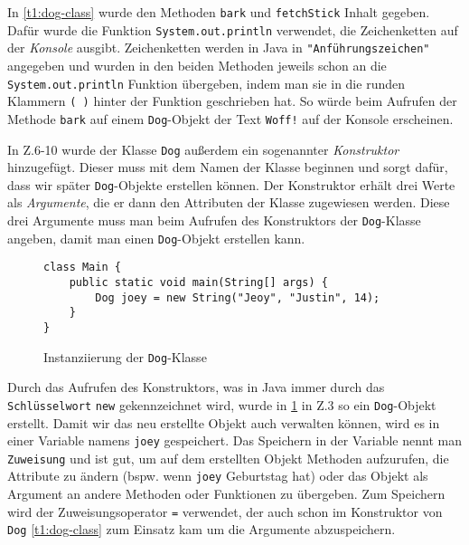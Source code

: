 In \autoref{t1:dog-class} wurde den Methoden \texttt{bark} und \texttt{fetchStick} Inhalt gegeben.
Dafür wurde die Funktion \texttt{System.out.println} verwendet, die Zeichenketten auf der \textit{Konsole} ausgibt.
Zeichenketten werden in Java in \texttt{"Anführungszeichen"} angegeben und wurden in den beiden Methoden jeweils schon an die \texttt{System.out.println} Funktion übergeben, indem man sie in die runden Klammern \texttt{( )} hinter der Funktion geschrieben hat.
So würde beim Aufrufen der Methode \texttt{bark} auf einem \texttt{Dog}-Objekt der Text \texttt{Woff!} auf der Konsole erscheinen.

In Z.6-10 wurde der Klasse \texttt{Dog} außerdem ein sogenannter \textit{Konstruktor} hinzugefügt.
Dieser muss mit dem Namen der Klasse beginnen und sorgt dafür, dass wir später \texttt{Dog}-Objekte erstellen können.
Der Konstruktor erhält drei Werte als \textit{Argumente}, die er dann den Attributen der Klasse zugewiesen werden.
Diese drei Argumente muss man beim Aufrufen des Konstruktors der \texttt{Dog}-Klasse angeben, damit man einen \texttt{Dog}-Objekt erstellen kann.

\begin{figure}[H]
    \caption{Instanziierung der \texttt{Dog}-Klasse}
    \label{t1:dog-class-instantiation}
    \begin{lstlisting}
class Main {
    public static void main(String[] args) {
        Dog joey = new String("Jeoy", "Justin", 14);
    }
}
    \end{lstlisting}
\end{figure}

Durch das Aufrufen des Konstruktors, was in Java immer durch das \texttt{Schlüsselwort} \texttt{new} gekennzeichnet wird, wurde in \ref{t1:dog-class-instantiation} in Z.3 so ein \texttt{Dog}-Objekt erstellt.
Damit wir das neu erstellte Objekt auch verwalten können, wird es in einer Variable namens \texttt{joey} gespeichert.
Das Speichern in der Variable nennt man \texttt{Zuweisung} und ist gut, um auf dem erstellten Objekt Methoden aufzurufen, die Attribute zu ändern (bspw. wenn \texttt{joey} Geburtstag hat) oder das Objekt als Argument an andere Methoden oder Funktionen zu übergeben.
Zum Speichern wird der Zuweisungsoperator \texttt{=} verwendet, der auch schon im Konstruktor von \texttt{Dog} \ref{t1:dog-class} zum Einsatz kam um die Argumente abzuspeichern.


